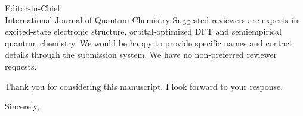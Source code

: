 \documentclass[11pt,a4paper]{letter}
\begin{document}
\begin{letter}{Editor-in-Chief\\International Journal of Quantum Chemistry}
Suggested reviewers are experts in excited-state electronic structure,
orbital-optimized DFT and semiempirical quantum chemistry. We would be happy
to provide specific names and contact details through the submission system.
We have no non-preferred reviewer requests.

Thank you for considering this manuscript. I look forward to your response.

\closing{Sincerely,}
\end{letter}
\end{document}
